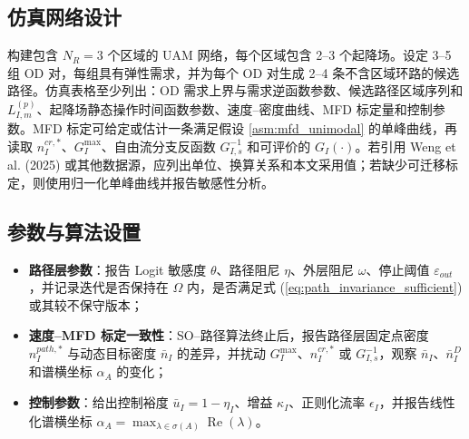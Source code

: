 \documentclass[a4paper,12pt]{article}
\theoremstyle{plain}
\theoremstyle{definition}
\theoremstyle{remark}
\begin{document}
\subsection{仿真网络设计}
构建包含 $N_R = 3$ 个区域的 UAM 网络，每个区域包含 2--3 个起降场。设定 3--5 组 OD 对，每组具有弹性需求，并为每个 OD 对生成 2--4 条不含区域环路的候选路径。仿真表格至少列出：OD 需求上界与需求逆函数参数、候选路径区域序列和 $L_{I,m}^{(p)}$、起降场静态操作时间函数参数、速度--密度曲线、MFD 标定量和控制参数。MFD 标定可给定或估计一条满足假设 \ref{asm:mfd_unimodal} 的单峰曲线，再读取 $n_I^{cr,*}$、$G_I^{\max}$、自由流分支反函数 $G_{I,s}^{-1}$ 和可评价的 $G_I(\cdot)$。若引用 Weng et al. (2025) 或其他数据源，应列出单位、换算关系和本文采用值；若缺少可迁移标定，则使用归一化单峰曲线并报告敏感性分析。

\subsection{参数与算法设置}
\begin{itemize}
    \item \textbf{路径层参数}：报告 Logit 敏感度 $\theta$、路径阻尼 $\eta$、外层阻尼 $\omega$、停止阈值 $\varepsilon_{out}$，并记录迭代是否保持在 $\Omega$ 内，是否满足式 (\ref{eq:path_invariance_sufficient}) 或其较不保守版本；
    \item \textbf{速度--MFD 标定一致性}：SO--路径算法终止后，报告路径层固定点密度 $n_I^{path,*}$ 与动态目标密度 $\bar n_I$ 的差异，并扰动 $G_I^{\max}$、$n_I^{cr,*}$ 或 $G_{I,s}^{-1}$，观察 $\bar n_I$、$\bar n_I^D$ 和谱横坐标 $\alpha_A$ 的变化；
    \item \textbf{控制参数}：给出控制裕度 $\bar u_I=1-\eta_I$、增益 $\kappa_I$、正则化流率 $\epsilon_I$，并报告线性化谱横坐标 $\alpha_A=\max_{\lambda\in\sigma(A)}\operatorname{Re}(\lambda)$。
\end{itemize}
\end{document}
